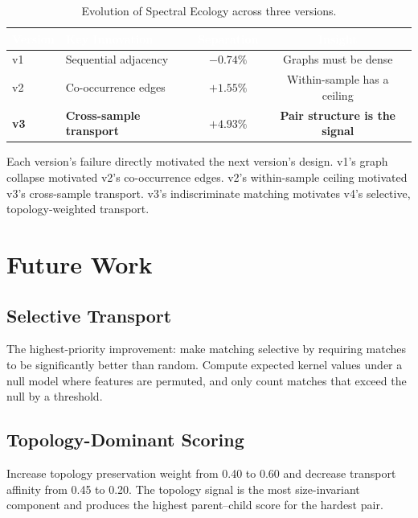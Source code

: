 \documentclass{../yalumba}
\begin{document}
\begin{table}[H]
  \centering
  \tablestyle
  \caption{Evolution of Spectral Ecology across three versions.}
  \label{tab:arc}
  \begin{tabular}{llcc}
    \toprule
    \rowcolor{table-header}
    \textcolor{white}{\textbf{Version}} &
    \textcolor{white}{\textbf{Key Innovation}} &
    \textcolor{white}{\textbf{Separation}} &
    \textcolor{white}{\textbf{Insight}} \\
    \midrule
    v1 & Sequential adjacency
      & $-0.74\%$ & Graphs must be dense \\
    v2 & Co-occurrence edges
      & $+1.55\%$ & Within-sample has a ceiling \\
    \textbf{v3} & \textbf{Cross-sample transport}
      & $\mathbf{+4.93\%}$ & \textbf{Pair structure is the signal} \\
    \bottomrule
  \end{tabular}
\end{table}

Each version's failure directly motivated the next version's design.  v1's
graph collapse motivated v2's co-occurrence edges.  v2's within-sample ceiling
motivated v3's cross-sample transport.  v3's indiscriminate matching motivates
v4's selective, topology-weighted transport.


\section{Future Work}
\label{sec:future}

\subsection{Selective Transport}

The highest-priority improvement: make matching selective by requiring matches
to be significantly better than random.  Compute expected kernel values under
a null model where features are permuted, and only count matches that exceed
the null by a threshold.

\subsection{Topology-Dominant Scoring}

Increase topology preservation weight from 0.40 to 0.60 and decrease transport
affinity from 0.45 to 0.20.  The topology signal is the most size-invariant
component and produces the highest parent--child score for the hardest pair.
\end{document}
